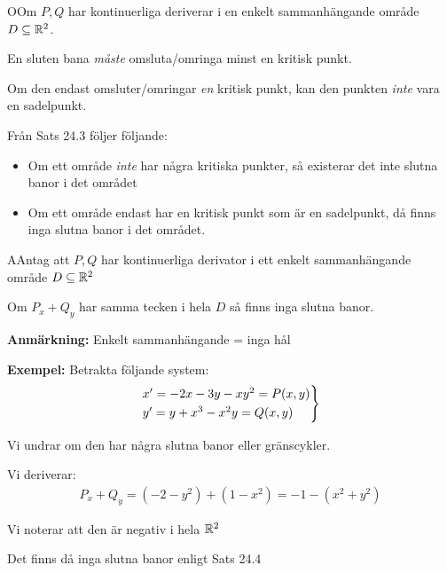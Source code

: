 \begin{theo}
  OOm $P,Q$ har kontinuerliga deriverar i en enkelt sammanhängande område $D\subseteq\mathbb{R}^2$.\par
  \noindent En sluten bana \textit{måste} omsluta/omringa minst en kritisk punkt.\par
  \noindent Om den endast omsluter/omringar \textit{en} kritisk punkt, kan den punkten \textit{inte} vara en sadelpunkt. 
\end{theo}
\par\bigskip
\noindent Från Sats 24.3 följer följande:
\begin{itemize}
  \item Om ett område \textit{inte} har några kritiska punkter, så existerar det inte slutna banor i det området
  \item Om ett område endast har en kritisk punkt som är en sadelpunkt, då finns inga slutna banor i det området.
\end{itemize}
\par\bigskip
\begin{theo}
  AAntag att $P,Q$ har kontinuerliga derivator i ett enkelt sammanhängande område $D\subseteq\mathbb{R}^2$\par
  \noindent Om $P_x+Q_y$ har samma tecken i hela $D$ så finns inga slutna banor. 
\end{theo}
\par\bigskip
\textbf{Anmärkning:} Enkelt sammanhängande = inga hål
\par\bigskip

\noindent\textbf{Exempel:} Betrakta följande system:
\begin{equation*}
  \begin{gathered}
    \begin{rcases*}
      x^{\prime} = -2x-3y-xy^2 = P(x,y)\\
      y^{\prime} = y+x^3-x^2y = Q(x,y)
    \end{rcases*}
  \end{gathered}
\end{equation*}
\par\bigskip
\noindent Vi undrar om den har några slutna banor eller gränscykler.\par
\noindent Vi deriverar:
\begin{equation*}
  \begin{gathered}
    P_x+Q_y = (-2-y^2)+(1-x^2)=-1-(x^2+y^2)
  \end{gathered}
\end{equation*}
\par\bigskip

\noindent Vi noterar att den är negativ i hela $\mathbb{R}^2$\par
\noindent Det finns då inga slutna banor enligt Sats 24.4 
